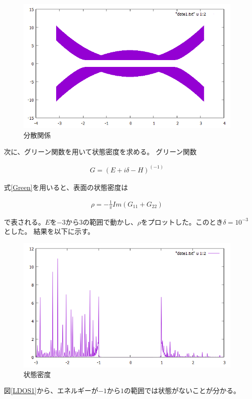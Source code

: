 \documentclass{jsarticle}
\begin{document}
            \begin{figure}[H]
                \centering
                \includegraphics[scale=0.7]{BdG_bry.png}
                \caption{分散関係}
                \label{Dispersion1}
            \end{figure}
    
            次に、グリーン関数を用いて状態密度を求める。
            グリーン関数
    
            \begin{align}
                G=(E+i\delta-H)^(-1)
                \label{Green}
            \end{align}
    
            式\eqref{Green}を用いると、表面の状態密度は
    
            \begin{align}
                \rho=-\frac{1}{\pi}Im(G_{11}+G_{22})
            \end{align}
    
            で表される。$E$を$-3$から$3$の範囲で動かし、$\rho$をプロットした。このとき$\delta=10^{-3}$とした。
            結果を以下に示す。
    
            \begin{figure}[H]
                \centering
                \includegraphics[scale=0.7]{LDOS_bry.png}
                \caption{状態密度}
                \label{LDOS1}
            \end{figure}
    
            図\eqref{LDOS1}から、エネルギーが$-1$から$1$の範囲では状態がないことが分かる。
    
    
    
\end{document}
